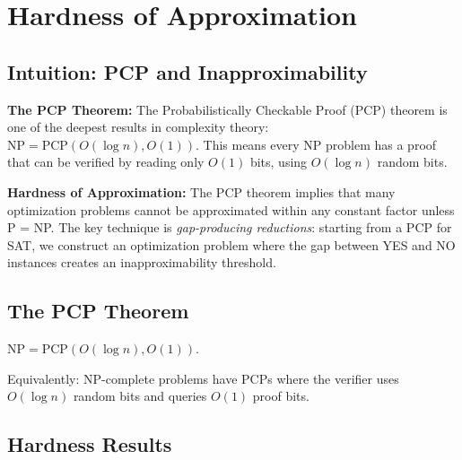 \setcounter{chapter}{28}
\chapter{Hardness of Approximation}
\label{ch:hardness}

\section{Intuition: PCP and Inapproximability}

\begin{intuitionbox}
\textbf{The PCP Theorem:} The Probabilistically Checkable Proof (PCP) theorem is one of the deepest results in complexity theory: $\text{NP} = \text{PCP}(O(\log n), O(1))$. This means every NP problem has a proof that can be verified by reading only $O(1)$ bits, using $O(\log n)$ random bits.

\textbf{Hardness of Approximation:} The PCP theorem implies that many optimization problems cannot be approximated within any constant factor unless P = NP. The key technique is \emph{gap-producing reductions}: starting from a PCP for SAT, we construct an optimization problem where the gap between YES and NO instances creates an inapproximability threshold.
\end{intuitionbox}

\section{The PCP Theorem}
\begin{theorem}
$\text{NP} = \text{PCP}(O(\log n), O(1))$.
\end{theorem}

Equivalently: NP-complete problems have PCPs where the verifier uses $O(\log n)$ random bits and queries $O(1)$ proof bits.

\section{Hardness Results}

